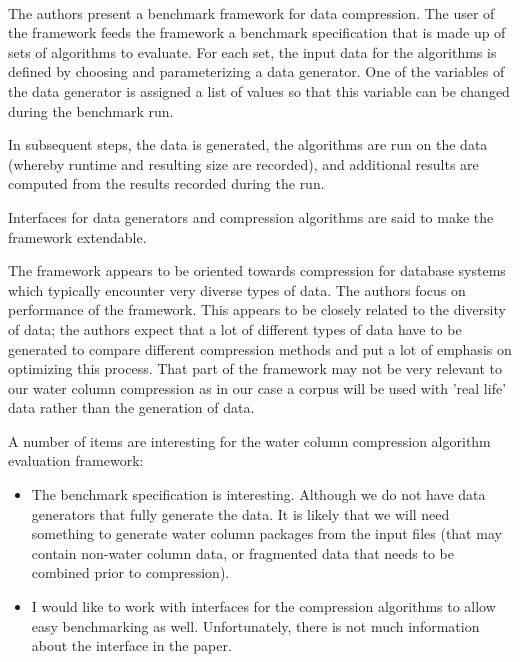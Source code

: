 \cite{damme2015benchmark}\\
The authors present a benchmark framework for data compression. The user of the framework feeds the framework a benchmark specification that is made up of sets of algorithms to evaluate. For each set, the input data for the algorithms is defined by choosing and parameterizing a data generator. One of the variables of the data generator is assigned a list of values so that this variable can be changed during the benchmark run.

In subsequent steps, the data is generated, the algorithms are run on the data (whereby runtime and resulting size are recorded), and additional results are computed from the results recorded during the run.

Interfaces for data generators and compression algorithms are said to make the framework extendable.

The framework appears to be oriented towards compression for database systems which typically encounter very diverse types of data. 
The authors focus on performance of the framework. This appears to be closely related to the diversity of data; the authors expect that a lot of different types of data have to be generated to compare different compression methods and put a lot of emphasis on optimizing this process. That part of the framework may not be very relevant to our water column compression as in our case a corpus will be used with 'real life' data rather than the generation of data.

A number of items are interesting for the water column compression algorithm evaluation framework:
\begin{itemize}
\item The benchmark specification is interesting. Although we do not have data generators that fully generate the data. It is likely that we will need something to generate water column packages from the input files (that may contain non-water column data, or fragmented data that needs to be combined prior to compression). 
\item I would like to work with interfaces for the compression algorithms to allow easy benchmarking as well. Unfortunately, there is not much information about the interface in the paper.
\end{itemize}

